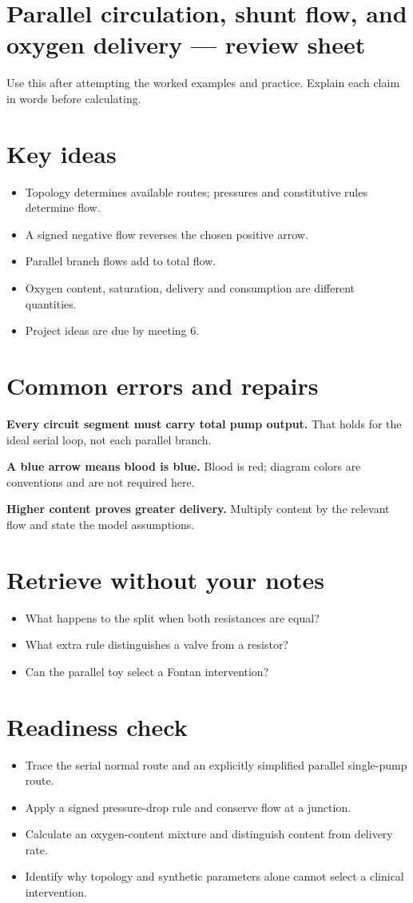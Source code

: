 \documentclass[11pt,letterpaper]{article}
\theoremstyle{definition}\newtheorem{definition}{Definition}\newtheorem{example}{Example}
\numberwithin{equation}{section}
\begin{document}
\section*{Parallel circulation, shunt flow, and oxygen delivery --- review sheet}
Use this after attempting the worked examples and practice. Explain each claim in words before calculating.

\section*{Key ideas}
\begin{itemize}
\item Topology determines available routes; pressures and constitutive rules determine flow.
\item A signed negative flow reverses the chosen positive arrow.
\item Parallel branch flows add to total flow.
\item Oxygen content, saturation, delivery and consumption are different quantities.
\item Project ideas are due by meeting 6.
\end{itemize}
\section*{Common errors and repairs}
\textbf{Every circuit segment must carry total pump output.} That holds for the ideal serial loop, not each parallel branch.

\textbf{A blue arrow means blood is blue.} Blood is red; diagram colors are conventions and are not required here.

\textbf{Higher content proves greater delivery.} Multiply content by the relevant flow and state the model assumptions.

\section*{Retrieve without your notes}
\begin{itemize}
\item What happens to the split when both resistances are equal?
\item What extra rule distinguishes a valve from a resistor?
\item Can the parallel toy select a Fontan intervention?
\end{itemize}
\section*{Readiness check}
\begin{itemize}
\item Trace the serial normal route and an explicitly simplified parallel single-pump route.
\item Apply a signed pressure-drop rule and conserve flow at a junction.
\item Calculate an oxygen-content mixture and distinguish content from delivery rate.
\item Identify why topology and synthetic parameters alone cannot select a clinical intervention.
\end{itemize}
\end{document}
